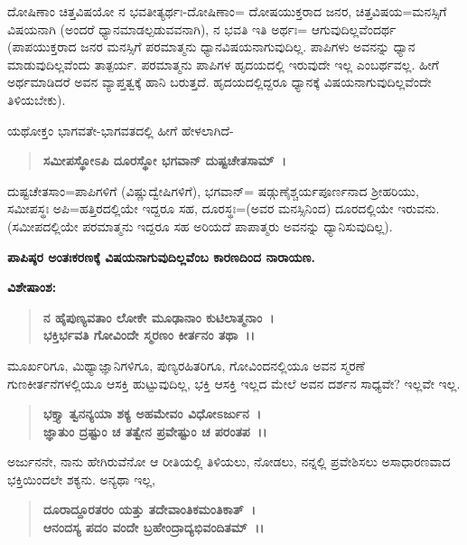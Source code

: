 ದೋಷಿಣಾಂ ಚಿತ್ತವಿಷಯೋ ನ ಭವತೀತ್ಯರ್ಥಃ-ದೋಷಿಣಾಂ= ದೋಷಯುಕ್ತರಾದ ಜನರ, ಚಿತ್ತವಿಷಯ=ಮನಸ್ಸಿಗೆ ವಿಷಯನಾಗಿ (ಅಂದರೆ ಧ್ಯಾನಮಾಡಲ್ಪಡುವವನಾಗಿ), ನ ಭವತಿ ಇತಿ ಅರ್ಥಃ= ಆಗುವುದಿಲ್ಲವೆಂದರ್ಥ (ಪಾಪಯುಕ್ತರಾದ ಜನರ ಮನಸ್ಸಿಗೆ ಪರಮಾತ್ಮನು ಧ್ಯಾನವಿಷಯನಾಗುವುದಿಲ್ಲ. ಪಾಪಿಗಳು ಅವನನ್ನು ಧ್ಯಾನ ಮಾಡುವುದಿಲ್ಲವೆಂದು ತಾತ್ಪರ್ಯ. ಪರಮಾತ್ಮನು ಪಾಪಿಗಳ ಹೃದಯದಲ್ಲಿ ಇರುವುದೇ ಇಲ್ಲ ಎಂಬರ್ಥವಲ್ಲ. ಹೀಗೆ ಅರ್ಥಮಾಡಿದರೆ ಅವನ ವ್ಯಾಪ್ತತ್ವಕ್ಕೆ ಹಾನಿ ಬರುತ್ತದೆ. ಹೃದಯದಲ್ಲಿದ್ದರೂ ಧ್ಯಾನಕ್ಕೆ ವಿಷಯನಾಗುವುದಿಲ್ಲವೆಂದೇ ತಿಳಿಯಬೇಕು).

\newpage

ಯಥೋಕ್ತಂ ಭಾಗವತೇ-ಭಾಗವತದಲ್ಲಿ ಹೀಗೆ ಹೇಳಲಾಗಿದೆ-

\begin{verse}
\textbf{ಸಮೀಪಸ್ಥೋಽಪಿ ದೂರಸ್ಥೋ ಭಗವಾನ್ ದುಷ್ಟಚೇತಸಾಮ್~।}
\end{verse}

ದುಷ್ಟಚೇತಸಾಂ=ಪಾಪಿಗಳಿಗೆ (ವಿಷ್ಣುದ್ವೇಷಿಗಳಿಗೆ), ಭಗವಾನ್= ಷಡ್ಗುಣೈಶ್ಚರ್ಯಪೂರ್ಣನಾದ ಶ‍್ರೀಹರಿಯು, ಸಮೀಪಸ್ಥಃ ಅಪಿ=ಹತ್ತಿರದಲ್ಲಿಯೇ ಇದ್ದರೂ ಸಹ, ದೂರಸ್ಥಃ=(ಅವರ ಮನಸ್ಸಿನಿಂದ) ದೂರದಲ್ಲಿಯೇ ಇರುವನು. (ಸಮೀಪದಲ್ಲಿಯೇ ಪರಮಾತ್ಮನು ಇದ್ದರೂ ಸಹ ಅರಿಯದೆ ಪಾಪಾತ್ಮರು ಅವನನ್ನು ಧ್ಯಾನಿಸುವುದಿಲ್ಲ).

\begin{center}
\textbf{ಪಾಪಿಷ್ಠರ ಅಂತಃಕರಣಕ್ಕೆ ವಿಷಯನಾಗುವುದಿಲ್ಲವೆಂಬ ಕಾರಣದಿಂದ ನಾರಾಯಣ.}
\end{center}

\noindent
\textbf{ವಿಶೇಷಾಂಶ:\enginline{-}}

\begin{verse}
\textbf{ನ ಹೈಪುಣ್ಯವತಾಂ ಲೋಕೇ ಮೂಢಾನಾಂ ಕುಟಿಲಾತ್ಮನಾಂ~।}\\\textbf{ಭಕ್ತಿರ್ಭವತಿ ಗೋವಿಂದೇ ಸ್ಮರಣಂ ಕೀರ್ತನಂ ತಥಾ~।।}
\end{verse}


ಮೂರ್ಖರಿಗೂ, ಮಿಥ್ಯಾಜ್ಞಾನಿಗಳಿಗೂ, ಪುಣ್ಯರಹಿತರಿಗೂ, ಗೋವಿಂದನಲ್ಲಿಯೂ ಅವನ ಸ್ಮರಣೆ ಗುಣಕೀರ್ತನೆಗಳಲ್ಲಿಯೂ ಆಸಕ್ತಿ ಹುಟ್ಟುವುದಿಲ್ಲ, ಭಕ್ತಿ ಆಸಕ್ತಿ ಇಲ್ಲದ ಮೇಲೆ ಅವನ ದರ್ಶನ ಸಾಧ್ಯವೇ? ಇಲ್ಲವೇ ಇಲ್ಲ.

\begin{verse}
\textbf{ಭಕ್ತ್ಯಾ ತ್ವನನ್ಯಯಾ ಶಕ್ಯ ಅಹಮೇವಂ ವಿಧೋಽರ್ಜುನ~।}\\\textbf{ಜ್ಞಾತುಂ ದ್ರಷ್ಟುಂ ಚ ತತ್ವೇನ ಪ್ರವೇಷ್ಟುಂ ಚ ಪರಂತಪ~।।}
\end{verse}


ಅರ್ಜುನನೇ, ನಾನು ಹೇಗಿರುವೆನೋ ಆ ರೀತಿಯಲ್ಲಿ ತಿಳಿಯಲು, ನೋಡಲು, ನನ್ನಲ್ಲಿ ಪ್ರವೇಶಿಸಲು ಅಸಾಧಾರಣವಾದ ಭಕ್ತಿಯಿಂದಲೇ ಶಕ್ಯನು. ಅನ್ಯಥಾ ಇಲ್ಲ,

\begin{verse}
\textbf{ದೂರಾದ್ದೂರತರಂ ಯತ್ತು ತದೇವಾಂತಿಕಮಂತಿಕಾತ್~।}\\\textbf{ಆನಂದಸ್ಯ ಪದಂ ವಂದೇ ಬ್ರಹೇಂದ್ರಾದ್ಯಭಿವಂದಿತಮ್~।।}
\end{verse}

